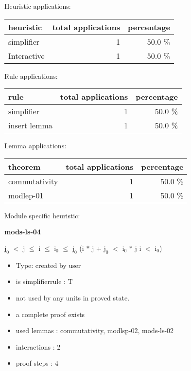 \documentclass[a4paper]{article}
\begin{document}
\medskip


Heuristic applications:

\begin{supertabular}{l|r|r}
heuristic	& total applications & percentage \\ \hline
simplifier & 1 & 50.0 \% \\
Interactive & 1 & 50.0 \% \\

\end{supertabular}

Rule applications:

\begin{supertabular}{l|r|r}
rule	        & total applications & percentage \\ \hline
simplifier & 1 & 50.0 \% \\
insert lemma & 1 & 50.0 \% \\

\end{supertabular}

Lemma applications:

\begin{supertabular}{l|r|r}
theorem	        & total applications & percentage \\ \hline
commutativity & 1 & 50.0 \% \\
modlep-01 & 1 & 50.0 \% \\

\end{supertabular}

Module specific heuristic:

\pagebreak

{\LARGE\bf mods-ls-04}\label{lemma-mods-ls-04}

\medskip

 \Fol $\mbox{j}_{0}$ $<$ j  $\le$ i  $\le$ $\mbox{i}_{0}$  $\le$ $\mbox{j}_{0}$ \Imp (i $*$ j + $\mbox{j}_{0}$ $<$ $\mbox{i}_{0}$ $*$ j \Equiv i $<$ $\mbox{i}_{0}$)

\begin{itemize}

\item Type: created by user

\item is simplifierrule : T
\item not used by any units in proved state.
\item       a complete proof exists
\item       used lemmas  : commutativity, modlsp-02, mods-ls-02
\item       interactions : 2
\item       proof steps  : 4
\end{itemize}
\end{document}
